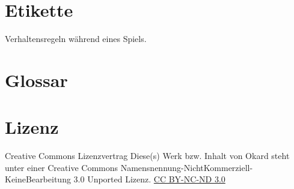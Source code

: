\documentclass{article}
\begin{document}
\section{Etikette}
	Verhaltensregeln während eines Spiels.
	
	

\section{Glossar}

\section{Lizenz}
Creative Commons Lizenzvertrag
Diese(s) Werk bzw. Inhalt von Okard steht unter einer Creative Commons Namensnennung-NichtKommerziell-KeineBearbeitung 3.0 Unported Lizenz.
\href{http://creativecommons.org/licenses/by-nc-nd/3.0/}{CC BY-NC-ND 3.0}
\end{document}

